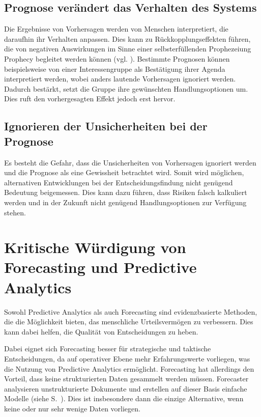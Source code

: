 

\subsection{Prognose verändert das Verhalten des Systems }

Die Ergebnisse von Vorhersagen werden von Menschen interpretiert,
die daraufhin ihr Verhalten anpassen. Dies kann zu Rückkopplungseffekten führen,
die von negativen Auswirkungen im Sinne einer selbsterfüllenden Prophezeiung
 Prophecy\grqq{} begleitet werden können
(vgl. \cite{Crossman}). 
Bestimmte Prognosen können beispielsweise von einer 
Interessengruppe als Bestätigung ihrer Agenda interpretiert werden, wobei
anders lautende Vorhersagen ignoriert werden. Dadurch bestärkt, setzt die Gruppe
ihre gewünschten Handlungsoptionen um. Dies ruft den vorhergesagten Effekt
jedoch erst hervor.

\subsection{Ignorieren der Unsicherheiten bei der Prognose}

Es besteht die Gefahr, dass die Unsicherheiten von Vorhersagen ignoriert werden
und die Prognose als eine Gewissheit betrachtet wird. Somit wird möglichen,
alternativen Entwicklungen bei der Entscheidungsfindung nicht genügend Bedeutung
beigemessen. Dies kann dazu führen, dass Risiken falsch kalkuliert werden und
in der Zukunft nicht genügend Handlungsoptionen zur Verfügung stehen.

\section{Kritische Würdigung von Forecasting und Predictive Analytics}

Sowohl Predictive Analytics als auch Forecasting sind evidenzbasierte Methoden,
die die Möglichkeit bieten, das menschliche Urteilsvermögen zu verbessern. Dies
kann dabei helfen, die Qualität von Entscheidungen zu heben.

Dabei eignet sich Forecasting besser für strategische und taktische Entscheidungen,
da auf operativer Ebene mehr Erfahrungswerte vorliegen, was die Nutzung von
Predictive Analytics ermöglicht. Forecasting hat allerdings den Vorteil, dass
keine strukturierten Daten gesammelt werden müssen. Forecaster analysieren unstrukturierte
Dokumente und erstellen auf dieser Basis einfache Modelle (siehe S.~\xcom).
Dies ist insbesondere dann die einzige Alternative, wenn keine oder nur sehr wenige
Daten vorliegen.

